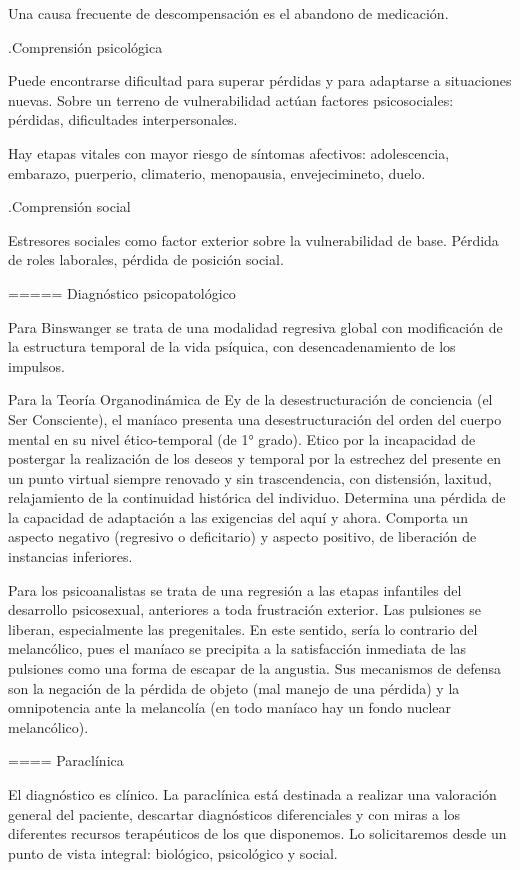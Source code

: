 \documentclass[encares.tex]{subfiles}
\begin{document}
Una causa frecuente de descompensación es el abandono de medicación.


.Comprensión psicológica

Puede encontrarse dificultad para superar pérdidas y para adaptarse a situaciones nuevas. Sobre un terreno de vulnerabilidad actúan factores psicosociales: pérdidas, dificultades interpersonales.

Hay etapas vitales con mayor riesgo de síntomas afectivos: adolescencia, embarazo, puerperio, climaterio, menopausia, envejecimineto, duelo.

.Comprensión social

Estresores sociales como factor exterior sobre la vulnerabilidad de base. Pérdida de roles laborales, pérdida de posición social.

===== Diagnóstico psicopatológico

Para Binswanger se trata de una modalidad regresiva global con modificación de la estructura temporal de la vida psíquica, con desencadenamiento de los impulsos.

Para la Teoría Organodinámica de Ey de la desestructuración de conciencia (el Ser Consciente), el maníaco presenta una desestructuración del orden del cuerpo mental en su nivel ético-temporal (de 1° grado). Etico por la incapacidad de postergar la realización de los deseos y temporal por la estrechez del presente en un punto virtual siempre renovado y sin trascendencia, con distensión, laxitud, relajamiento de la continuidad histórica del individuo. Determina una pérdida de la capacidad de adaptación a las exigencias del aquí y ahora. Comporta un aspecto negativo (regresivo o deficitario) y aspecto positivo, de liberación de instancias inferiores.

Para los psicoanalistas se trata de una regresión a las etapas infantiles del desarrollo psicosexual, anteriores a toda frustración exterior. Las pulsiones se liberan, especialmente las pregenitales. En este sentido, sería lo contrario del melancólico, pues el maníaco se precipita a la satisfacción inmediata de las pulsiones como una forma de escapar de la angustia. Sus mecanismos de defensa son la negación de la pérdida de objeto (mal manejo de una pérdida) y la omnipotencia ante la melancolía (en todo maníaco hay un fondo nuclear melancólico).

==== Paraclínica

El diagnóstico es clínico. La paraclínica está destinada a realizar una valoración general del paciente, descartar diagnósticos diferenciales y con miras a los diferentes recursos terapéuticos de los que disponemos. Lo solicitaremos desde un punto de vista integral: biológico, psicológico y social.
\end{document}
